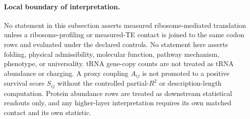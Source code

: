 \paragraph{Local boundary of interpretation.}
No statement in this subsection asserts measured ribosome-mediated translation unless a ribosome-profiling or measured-TE contact is joined to the same codon rows and evaluated under the declared controls.  No statement here asserts folding, physical admissibility, molecular function, pathway mechanism, phenotype, or universality.  tRNA gene-copy counts are not treated as tRNA abundance or charging.  A proxy coupling $A_{ij}$ is not promoted to a positive survival score $S_{ij}$ without the controlled partial-$R^2$ or description-length computation.  Protein abundance rows are treated as downstream statistical readouts only, and any higher-layer interpretation requires its own matched contact and its own statistic.

